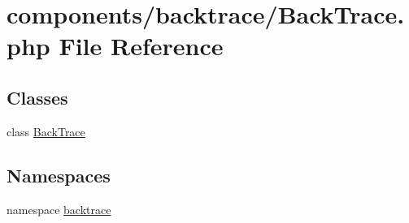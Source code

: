 \hypertarget{_back_trace_8php}{
\section{components/backtrace/BackTrace.php File Reference}
\label{_back_trace_8php}
}
\subsection*{Classes}
\begin{CompactItemize}
\item 
class \hyperlink{class_back_trace}{BackTrace}
\end{CompactItemize}
\subsection*{Namespaces}
\begin{CompactItemize}
\item 
namespace \hyperlink{namespacebacktrace}{backtrace}
\end{CompactItemize}
